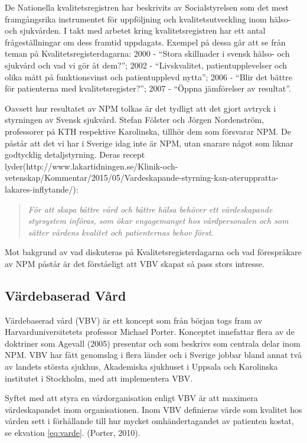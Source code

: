 De Nationella kvalitetsregistren har beskrivits av Socialstyrelsen som det mest framgångsrika instrumentet för uppföljning och kvalitetsutveckling inom hälso- och sjukvården. I takt med arbetet kring kvalitetsregistren har ett antal frågeställningar om dess framtid uppdagats. Exempel på dessa går att se från teman på Kvalitetsregisterdagarna: 2000 - “Stora skillnader i svensk hälso- och sjukvård och vad vi gör åt dem?”; 2002 - “Livskvalitet, patientupplevelser och olika mått på funktionsvinst och patientupplevd nytta”; 2006 - “Blir det bättre för patienterna med kvalitetsregister?”; 2007 - “Öppna jämförelser av resultat”.

Oavsett hur resultatet av NPM tolkas är det tydligt att det gjort avtryck i styrningen av Svensk sjukvård. Stefan Fölster och Jörgen Nordenström, professorer på KTH respektive Karolinska, tillhör dem som försvarar NPM. De påstår att det vi har i Sverige idag inte är NPM, utan snarare något som liknar godtycklig detaljstyrning. Deras recept lyder(http://www.lakartidningen.se/Klinik-och-vetenskap/Kommentar/2015/05/Vardeskapande-styrning-kan-ateruppratta-lakares-inflytande/):

\begin{quotation}
\textit{För att skapa bättre vård och bättre hälsa behöver ett värdeskapande styrsystem införas, som ökar engagemanget hos vårdpersonalen och som sätter vårdens kvalitet och patienternas behov först.}
\end{quotation}

Mot bakgrund av vad diskuteras på Kvalitetsregisterdagarna och vad förespråkare av NPM påstår är det förståeligt att VBV skapat så pass stors intresse. 

\subsection{Värdebaserad Vård}

Värdebaserad vård (VBV) är ett koncept som från början togs fram av Harvarduniversitetets professor Michael Porter. Konceptet innefattar flera av de doktriner som Agevall (2005) presentar och som beskrivs som centrala delar inom NPM. VBV har fått genomslag i flera länder och i Sverige jobbar bland annat två av landets största sjukhus, Akademiska sjukhuset i Uppsala och Karolinska institutet i Stockholm, med att implementera VBV.
 
Syftet med att styra en vårdorganisation enligt VBV är att maximera värdeskapandet inom organisationen. Inom VBV definieras värde som kvalitet hos vården sett i förhållande till hur mycket omhändertagandet av patienten kostat, se ekvation \ref{eq:varde}. (Porter, 2010).

